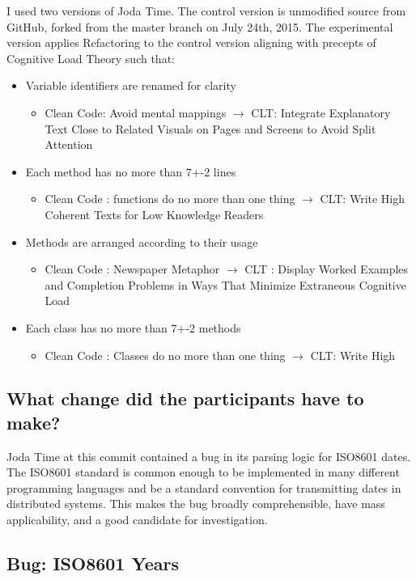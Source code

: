 I used two versions of Joda Time. The control version is unmodified source from GitHub, forked from the master branch on July 24th, 2015. The experimental version applies Refactoring to the control version aligning with precepts of Cognitive Load Theory such that:
\begin{itemize}
	\item Variable identifiers are renamed for clarity
	\begin{itemize}
   		\item Clean Code: Avoid mental mappings $\rightarrow$ CLT: Integrate Explanatory Text Close to Related Visuals on Pages and Screens to Avoid Split Attention
	\end{itemize}
   	\item Each method has no more than 7+-2 lines
   	\begin{itemize}
		\item Clean Code : functions do no more than one thing $\rightarrow$ CLT: Write High Coherent Texts for Low Knowledge Readers
	\end{itemize}
	\item Methods are arranged according to their usage
	\begin{itemize}
		\item Clean Code : Newspaper Metaphor $\rightarrow$ CLT : Display Worked Examples and Completion Problems in Ways That Minimize Extraneous Cognitive Load
	\end{itemize}
	\item Each class has no more than 7+-2 methods
	\begin{itemize}
		\item Clean Code : Classes do no more than one thing $\rightarrow$ CLT: Write High 
	\end{itemize}
\end{itemize}
\subsection{What change did the participants have to make?}

Joda Time at this commit contained a bug in its parsing logic for ISO8601 dates. The ISO8601 standard is common enough to be implemented in many different programming languages and be a standard convention for transmitting dates in distributed systems. This makes the bug broadly comprehensible, have mass applicability, and a good candidate for investigation.  	
 
\subsection{Bug: ISO8601 Years}

